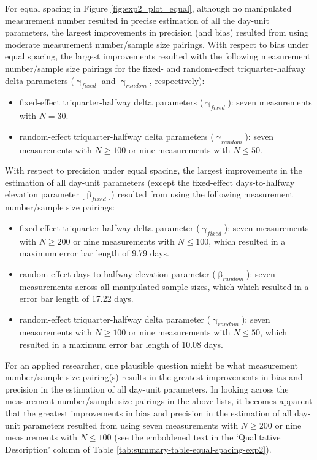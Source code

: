 \documentclass[
12pt, %
twoside,
english]{guelphthesis}
\begin{document}
For equal spacing in Figure \ref{fig:exp2_plot_equal}, although no manipulated measurement number resulted in precise estimation of all the day-unit parameters, the largest improvements in precision (and bias) resulted from using moderate measurement number/sample size pairings. With respect to bias under equal spacing, the largest improvements resulted with the following measurement number/sample size pairings for the fixed- and random-effect triquarter-halfway delta parameters (\(\upgamma_{fixed}\) and \(\upgamma_{random}\), respectively):
\begin{itemize}
\tightlist
\item
  fixed-effect triquarter-halfway delta parameters (\(\upgamma_{fixed}\)): seven measurements with \(N = 30\).
\item
  random-effect triquarter-halfway delta parameters (\(\upgamma_{random}\)): seven measurements with \(N \ge 100\) or nine measurements with \(N \le 50\).
\end{itemize}
\noindent With respect to precision under equal spacing, the largest improvements in the estimation of all day-unit parameters (except the fixed-effect days-to-halfway elevation parameter {[}\(\upbeta_{fixed}\){]}) resulted from using the following measurement number/sample size pairings:
\begin{itemize}
\tightlist
\item
  fixed-effect triquarter-halfway delta parameter (\(\upgamma_{fixed}\)): seven measurements with \(N \ge 200\) or nine measurements with \(N \le 100\), which resulted in a maximum error bar length of 9.79 days.
\item
  random-effect days-to-halfway elevation parameter (\(\upbeta_{random}\)): seven measurements across all manipulated sample sizes, which which resulted in a error bar length of 17.22 days.
\item
  random-effect triquarter-halfway delta parameter (\(\upgamma_{random}\)): seven measurements with \(N \ge 100\) or nine measurements with \(N \le 50\), which resulted in a maximum error bar length of 10.08 days.
\end{itemize}
For an applied researcher, one plausible question might be what measurement number/sample size pairing(s) results in the greatest improvements in bias and precision in the estimation of all day-unit parameters. In looking across the measurement number/sample size pairings in the above lists, it becomes apparent that the greatest improvements in bias and precision in the estimation of all day-unit parameters resulted from using seven measurements with \(N \ge 200\) or nine measurements with \(N \le 100\) (see the emboldened text in the `Qualitative Description' column of Table \ref{tab:summary-table-equal-spacing-exp2}).
\end{document}
